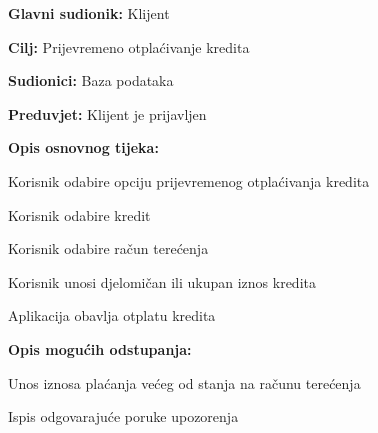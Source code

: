     		
    		\noindent {}
    		\begin{packed_item}
    			
    			\item \textbf{Glavni sudionik: }Klijent
    			\item  \textbf{Cilj:} Prijevremeno otplaćivanje kredita
    			\item  \textbf{Sudionici:} Baza podataka
    			\item  \textbf{Preduvjet:} Klijent je prijavljen
    			\item  \textbf{Opis osnovnog tijeka:}
    			
    			\item[] \begin{packed_enum}
    				
    				\item Korisnik odabire opciju prijevremenog otplaćivanja kredita
    				\item Korisnik odabire kredit
    				\item Korisnik odabire račun terećenja
    				\item Korisnik unosi djelomičan ili ukupan iznos kredita
    				\item Aplikacija obavlja otplatu kredita
    				
    				
    				
    			\end{packed_enum}
    		
    			\item  \textbf{Opis mogućih odstupanja:}
    		
    		\item[] \begin{packed_item}
    			
    			\item[3.a] Unos iznosa plaćanja većeg od stanja na računu terećenja
    			\item[] \begin{packed_enum}
    				
    				\item Ispis odgovarajuće poruke upozorenja
    				
    				
    			\end{packed_enum}
    			
    			
    		\end{packed_item}
    			
    		\end{packed_item}
    	 
